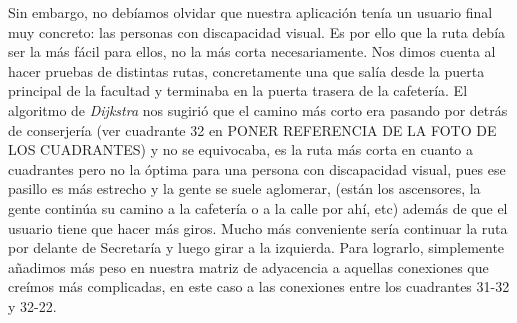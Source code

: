 Sin embargo, no debíamos olvidar que nuestra aplicación tenía un usuario final muy concreto: las personas con discapacidad visual. Es por ello que la ruta debía ser la más fácil para ellos, no la más corta necesariamente. Nos dimos cuenta al hacer pruebas de distintas rutas, concretamente una que salía desde la puerta principal de la facultad y terminaba en la puerta trasera de la cafetería. El algoritmo de \textit{Dijkstra} nos sugirió que el camino más corto era pasando por detrás de conserjería (ver cuadrante 32 en PONER REFERENCIA DE LA FOTO DE LOS CUADRANTES) y no se equivocaba, es la ruta más corta en cuanto a cuadrantes pero no la óptima para una persona con discapacidad visual, pues ese pasillo es más estrecho y la gente se suele aglomerar, (están los ascensores, la gente continúa su camino a la cafetería o a la calle por ahí, etc) además de que el usuario tiene que hacer más giros. Mucho más conveniente sería continuar la ruta por delante de Secretaría y luego girar a la izquierda. Para lograrlo, simplemente añadimos más peso en nuestra matriz de adyacencia a aquellas conexiones que creímos más complicadas, en este caso a las conexiones entre los cuadrantes 31-32 y 32-22.